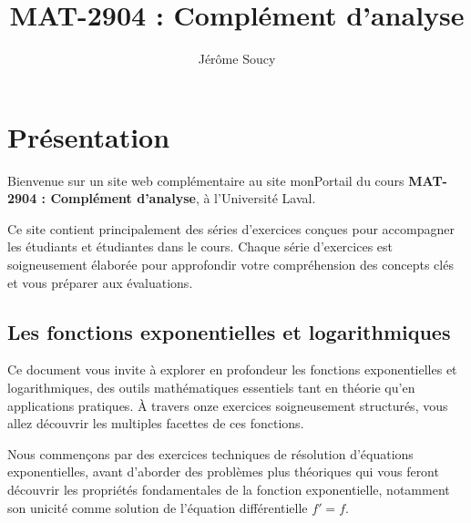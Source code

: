 \documentclass[
  12pt,
  letterpaper,
]{book}
\title{MAT-2904 : Complément d'analyse}
\author{Jérôme Soucy}
\date{}
\renewcommand*\contentsname{Table des matières}
\newcommand\contentsname{Table des matières}
\theoremstyle{remark}
\begin{document}
\frontmatter
\maketitle
\ifdefined\Shaded\renewenvironment{Shaded}{\begin{tcolorbox}[boxrule=0pt, interior hidden, borderline west={3pt}{0pt}{shadecolor}, breakable, frame hidden, enhanced, sharp corners]}{\end{tcolorbox}}\fi

\renewcommand*\contentsname{Table des matières}
{
\hypersetup{linkcolor=}
\setcounter{tocdepth}{2}
\tableofcontents
}
\listoffigures
\listoftables
\mainmatter
{}

\hypertarget{pruxe9sentation}{%
\chapter*{Présentation}\label{pruxe9sentation}}


Bienvenue sur un site web complémentaire au site monPortail du cours
\textbf{MAT-2904 : Complément d'analyse}, à l'Université Laval.

Ce site contient principalement des séries d'exercices conçues pour
accompagner les étudiants et étudiantes dans le cours. Chaque série
d'exercices est soigneusement élaborée pour approfondir votre
compréhension des concepts clés et vous préparer aux évaluations.

\hypertarget{les-fonctions-exponentielles-et-logarithmiques}{%
\section*{Les fonctions exponentielles et
logarithmiques}\label{les-fonctions-exponentielles-et-logarithmiques}}


Ce document vous invite à explorer en profondeur les fonctions
exponentielles et logarithmiques, des outils mathématiques essentiels
tant en théorie qu'en applications pratiques. À travers onze exercices
soigneusement structurés, vous allez découvrir les multiples facettes de
ces fonctions.

Nous commençons par des exercices techniques de résolution d'équations
exponentielles, avant d'aborder des problèmes plus théoriques qui vous
feront découvrir les propriétés fondamentales de la fonction
exponentielle, notamment son unicité comme solution de l'équation
différentielle \(f'=f\).
\end{document}
